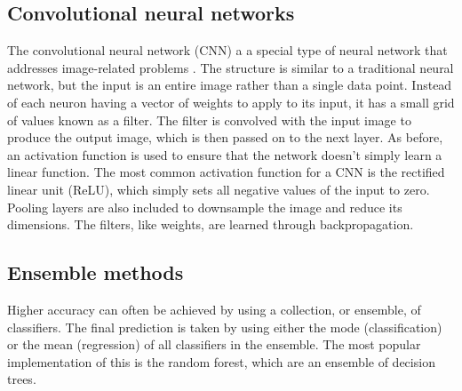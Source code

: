 \subsection{Convolutional neural networks}
The convolutional neural network (CNN) a a special type of neural network that addresses image-related problems \cite{lecun1999}.  The structure is similar to a traditional neural network, but the input is an entire image rather than a single data point. Instead of each neuron having a vector of weights to apply to its input, it has a small grid of values known as a filter.  The filter is convolved with the input image to produce the output image, which is then passed on to the next layer.  As before, an activation function is used to ensure that the network doesn't simply learn a linear function.  The most common activation function for a CNN is the rectified linear unit (ReLU), which simply sets all negative values of the input to zero.  Pooling layers are also included to downsample the image and reduce its dimensions.  The filters, like weights, are learned through backpropagation.

\subsection{Ensemble methods}
Higher accuracy can often be achieved by using a collection, or ensemble, of classifiers.  The final prediction is taken by using either the mode (classification) or the mean (regression) of all classifiers in the ensemble.  The most popular implementation of this is the random forest, which are an ensemble of decision trees.

